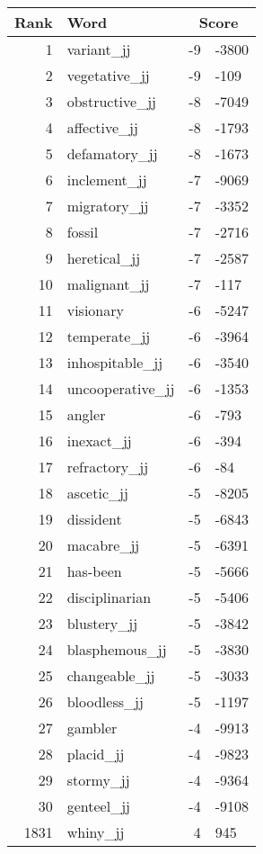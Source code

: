 \begin{longtable}[!htbp]{| rlr@{.}l |}
    \hline
    \textbf{Rank} & \textbf{Word} & \multicolumn{2}{c|}{\textbf{Score}} \\
    \hline
    \endhead
    1 & variant\_jj & -9 & -3800 \\
    2 & vegetative\_jj & -9 & -109 \\
    3 & obstructive\_jj & -8 & -7049 \\
    4 & affective\_jj & -8 & -1793 \\
    5 & defamatory\_jj & -8 & -1673 \\
    6 & inclement\_jj & -7 & -9069 \\
    7 & migratory\_jj & -7 & -3352 \\
    8 & fossil & -7 & -2716 \\
    9 & heretical\_jj & -7 & -2587 \\
    10 & malignant\_jj & -7 & -117 \\
    11 & visionary & -6 & -5247 \\
    12 & temperate\_jj & -6 & -3964 \\
    13 & inhospitable\_jj & -6 & -3540 \\
    14 & uncooperative\_jj & -6 & -1353 \\
    15 & angler & -6 & -793 \\
    16 & inexact\_jj & -6 & -394 \\
    17 & refractory\_jj & -6 & -84 \\
    18 & ascetic\_jj & -5 & -8205 \\
    19 & dissident & -5 & -6843 \\
    20 & macabre\_jj & -5 & -6391 \\
    21 & has-been & -5 & -5666 \\
    22 & disciplinarian & -5 & -5406 \\
    23 & blustery\_jj & -5 & -3842 \\
    24 & blasphemous\_jj & -5 & -3830 \\
    25 & changeable\_jj & -5 & -3033 \\
    26 & bloodless\_jj & -5 & -1197 \\
    27 & gambler & -4 & -9913 \\
    28 & placid\_jj & -4 & -9823 \\
    29 & stormy\_jj & -4 & -9364 \\
    30 & genteel\_jj & -4 & -9108 \\
    1831 & whiny\_jj & 4 & 945 \\

\end{longtable}
